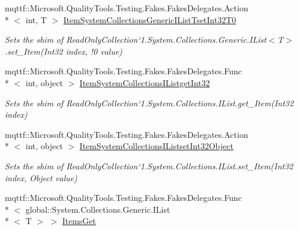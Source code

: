 \begin{DoxyCompactItemize}
mqttf\-::\-Microsoft.\-Quality\-Tools.\-Testing.\-Fakes.\-Fakes\-Delegates.\-Action\\*
$<$ int, T $>$ \hyperlink{class_system_1_1_collections_1_1_object_model_1_1_fakes_1_1_shim_read_only_collection_3_01_t_01_4_aa7c781cf946cf85653106c72b253eef3}{Item\-System\-Collections\-Generic\-I\-List\-Tset\-Int32\-T0}
\begin{DoxyCompactList}\small\item\em Sets the shim of Read\-Only\-Collection`1.System.\-Collections.\-Generic.\-I\-List$<$T$>$.set\-\_\-\-Item(Int32 index, !0 value)\end{DoxyCompactList}\item 
mqttf\-::\-Microsoft.\-Quality\-Tools.\-Testing.\-Fakes.\-Fakes\-Delegates.\-Func\\*
$<$ int, object $>$ \hyperlink{class_system_1_1_collections_1_1_object_model_1_1_fakes_1_1_shim_read_only_collection_3_01_t_01_4_aa81cef4d5f93578971191f01f1e33640}{Item\-System\-Collections\-I\-Listget\-Int32}
\begin{DoxyCompactList}\small\item\em Sets the shim of Read\-Only\-Collection`1.System.\-Collections.\-I\-List.\-get\-\_\-\-Item(\-Int32 index)\end{DoxyCompactList}\item 
mqttf\-::\-Microsoft.\-Quality\-Tools.\-Testing.\-Fakes.\-Fakes\-Delegates.\-Action\\*
$<$ int, object $>$ \hyperlink{class_system_1_1_collections_1_1_object_model_1_1_fakes_1_1_shim_read_only_collection_3_01_t_01_4_a112e69df2e2a9cba7e1b52540433d6f6}{Item\-System\-Collections\-I\-Listset\-Int32\-Object}
\begin{DoxyCompactList}\small\item\em Sets the shim of Read\-Only\-Collection`1.System.\-Collections.\-I\-List.\-set\-\_\-\-Item(\-Int32 index, Object value)\end{DoxyCompactList}\item 
mqttf\-::\-Microsoft.\-Quality\-Tools.\-Testing.\-Fakes.\-Fakes\-Delegates.\-Func\\*
$<$ global\-::\-System.\-Collections.\-Generic.\-I\-List\\*
$<$ T $>$ $>$ \hyperlink{class_system_1_1_collections_1_1_object_model_1_1_fakes_1_1_shim_read_only_collection_3_01_t_01_4_aee6a18d71bd9960625d6a45b35925bd1}{Items\-Get}

\end{DoxyCompactItemize}

